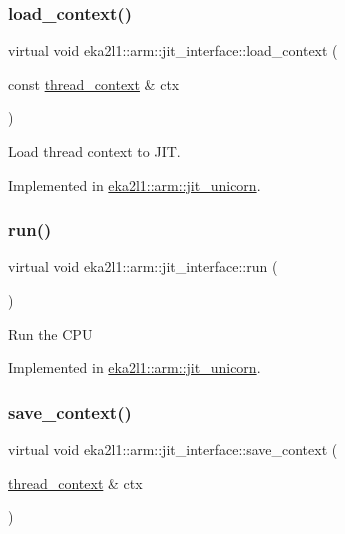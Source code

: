 \subsubsection{\texorpdfstring{load\+\_\+context()}{load\_context()}}
{\footnotesize\ttfamily virtual void eka2l1\+::arm\+::jit\+\_\+interface\+::load\+\_\+context (\begin{DoxyParamCaption}\item[{const \mbox{\hyperlink{structeka2l1_1_1arm_1_1jit__interface_1_1thread__context}{thread\+\_\+context}} \&}]{ctx }\end{DoxyParamCaption})\hspace{0.3cm}{\ttfamily [pure virtual]}}

Load thread context to J\+IT. 

Implemented in \mbox{\hyperlink{classeka2l1_1_1arm_1_1jit__unicorn_a54d69d4246e4c22e06b3d4b2b43d9872}{eka2l1\+::arm\+::jit\+\_\+unicorn}}.

\mbox{\label{classeka2l1_1_1arm_1_1jit__interface_a30ede595d2381735d13642768dda3be8}} 
\subsubsection{\texorpdfstring{run()}{run()}}
{\footnotesize\ttfamily virtual void eka2l1\+::arm\+::jit\+\_\+interface\+::run (\begin{DoxyParamCaption}{ }\end{DoxyParamCaption})\hspace{0.3cm}{\ttfamily [pure virtual]}}

Run the C\+PU 

Implemented in \mbox{\hyperlink{classeka2l1_1_1arm_1_1jit__unicorn_a98e8406378258c67449780280d839ac3}{eka2l1\+::arm\+::jit\+\_\+unicorn}}.

\mbox{\label{classeka2l1_1_1arm_1_1jit__interface_ad45558cfaff99f21a89734676b13cb9a}} 
\subsubsection{\texorpdfstring{save\+\_\+context()}{save\_context()}}
{\footnotesize\ttfamily virtual void eka2l1\+::arm\+::jit\+\_\+interface\+::save\+\_\+context (\begin{DoxyParamCaption}\item[{\mbox{\hyperlink{structeka2l1_1_1arm_1_1jit__interface_1_1thread__context}{thread\+\_\+context}} \&}]{ctx }\end{DoxyParamCaption})\hspace{0.3cm}{\ttfamily [pure virtual]}}

